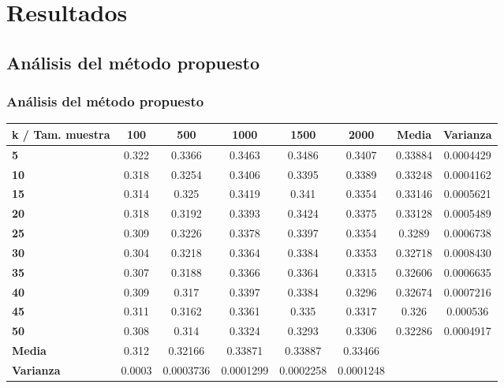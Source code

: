 \section{Resultados}

\subsection{Análisis del método propuesto}
\begin{frame}[allowframebreaks]
	\frametitle{Análisis del método propuesto}
	\begin{table}[h!]
		\scriptsize
		\begin{tabularx}{\textwidth}{Xccccccc}
			\toprule
			\textbf{k / Tam. muestra} &
			\textbf{100} &
			\textbf{500} &
			\textbf{1000} &
			\textbf{1500} &
			\textbf{2000} &
			\textbf{Media} &
			\textbf{Varianza} \\ \midrule
			\textbf{5}  & 0.322 & 0.3366 & 0.3463 & 0.3486 & 0.3407 & 0.33884                         & 0.0004429                         \\
			\textbf{10} & 0.318 & 0.3254 & 0.3406 & 0.3395 & 0.3389 & 0.33248                         & \cellcolor[HTML]{D9EAD3}0.0004162 \\
			\textbf{15} & 0.314 & 0.325  & 0.3419 & 0.341  & 0.3354 & 0.33146                         & 0.0005621                       \\
			\textbf{20} & 0.318 & 0.3192 & 0.3393 & 0.3424 & 0.3375 & 0.33128                         & 0.0005489                        \\
			\textbf{25} & 0.309 & 0.3226 & 0.3378 & 0.3397 & 0.3354 & 0.3289                          & 0.0006738                           \\
			\textbf{30} & 0.304 & 0.3218 & 0.3364 & 0.3384 & 0.3353 & 0.32718                         & 0.0008430                        \\
			\textbf{35} & 0.307 & 0.3188 & 0.3366 & 0.3364 & 0.3315 & 0.32606                         & 0.0006635                       \\
			\textbf{40} & 0.309 & 0.317  & 0.3397 & 0.3384 & 0.3296 & 0.32674                         & 0.0007216                      \\
			\textbf{45} & 0.311 & 0.3162 & 0.3361 & 0.335  & 0.3317 & 0.326                           & 0.000536                      \\
			\textbf{50} & 0.308 & 0.314  & 0.3324 & 0.3293 & 0.3306 & \cellcolor[HTML]{D9EAD3}0.32286 & 0.0004917                         \\
			\midrule
			\textbf{Media} &
			\cellcolor[HTML]{D9EAD3}0.312 &
			0.32166 &
			0.33871 &
			0.33887 &
			0.33466 &
			\\
			\textbf{Varianza} &
			0.0003 &
			0.0003736 &
			0.0001299 &
			0.0002258 &
			\cellcolor[HTML]{D9EAD3}0.0001248 &
			\\
			\bottomrule
		\end{tabularx}
		\label{tab:analisis-error-vs-k}
	\end{table}


\end{frame}
